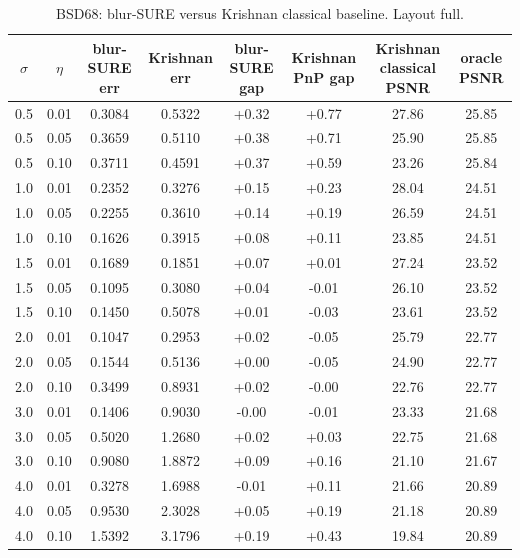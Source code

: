 \begin{table}[h]
\centering
\small
\begin{tabular}{cccccccc}
\toprule
$\sigma$ & $\eta$ & blur-SURE err & Krishnan err & blur-SURE gap & Krishnan PnP gap & Krishnan classical PSNR & oracle PSNR \\
\midrule
0.5 & 0.01 & 0.3084 & 0.5322 & +0.32 & +0.77 & 27.86 & 25.85 \\
0.5 & 0.05 & 0.3659 & 0.5110 & +0.38 & +0.71 & 25.90 & 25.85 \\
0.5 & 0.10 & 0.3711 & 0.4591 & +0.37 & +0.59 & 23.26 & 25.84 \\
1.0 & 0.01 & 0.2352 & 0.3276 & +0.15 & +0.23 & 28.04 & 24.51 \\
1.0 & 0.05 & 0.2255 & 0.3610 & +0.14 & +0.19 & 26.59 & 24.51 \\
1.0 & 0.10 & 0.1626 & 0.3915 & +0.08 & +0.11 & 23.85 & 24.51 \\
1.5 & 0.01 & 0.1689 & 0.1851 & +0.07 & +0.01 & 27.24 & 23.52 \\
1.5 & 0.05 & 0.1095 & 0.3080 & +0.04 & -0.01 & 26.10 & 23.52 \\
1.5 & 0.10 & 0.1450 & 0.5078 & +0.01 & -0.03 & 23.61 & 23.52 \\
2.0 & 0.01 & 0.1047 & 0.2953 & +0.02 & -0.05 & 25.79 & 22.77 \\
2.0 & 0.05 & 0.1544 & 0.5136 & +0.00 & -0.05 & 24.90 & 22.77 \\
2.0 & 0.10 & 0.3499 & 0.8931 & +0.02 & -0.00 & 22.76 & 22.77 \\
3.0 & 0.01 & 0.1406 & 0.9030 & -0.00 & -0.01 & 23.33 & 21.68 \\
3.0 & 0.05 & 0.5020 & 1.2680 & +0.02 & +0.03 & 22.75 & 21.68 \\
3.0 & 0.10 & 0.9080 & 1.8872 & +0.09 & +0.16 & 21.10 & 21.67 \\
4.0 & 0.01 & 0.3278 & 1.6988 & -0.01 & +0.11 & 21.66 & 20.89 \\
4.0 & 0.05 & 0.9530 & 2.3028 & +0.05 & +0.19 & 21.18 & 20.89 \\
4.0 & 0.10 & 1.5392 & 3.1796 & +0.19 & +0.43 & 19.84 & 20.89 \\
\bottomrule
\end{tabular}
\caption{BSD68: blur-SURE versus Krishnan classical baseline. Layout full.}
\label{tab:krishnan_compare_bsd68}
\end{table}

